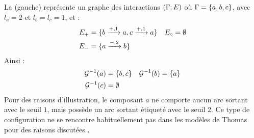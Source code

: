 \begin{example}
  La (gauche) représente un graphe des interactions $(\mathrm{\Gamma}; E)$ où
  $\mathrm{\Gamma} = \{a, b, c\}$, avec $l_a = 2$ et $l_b = l_c = 1$, et :
  \begin{align*}
    E_+ &= \{b \xrightarrow{+, 1} a, c \xrightarrow{+, 1} a\} &
    E_\circ &= \emptyset \\
    E_- &= \{a \xrightarrow{-, 2} b\}
  \end{align*}
  Ainsi :
  \begin{align*}
    \mathcal{G}^{-1}(a) &= \{ b, c \} &
    \mathcal{G}^{-1}(b) &= \{ a \} \\
    \mathcal{G}^{-1}(c) &= \emptyset
  \end{align*}
  Pour des raisons d'illustration, le composant $a$ ne comporte aucun arc sortant avec le seuil
  $1$, mais possède un arc sortant étiqueté avec le seuil $2$.
  Ce type de configuration ne se rencontre habituellement pas dans les modèles de Thomas
  pour des raisons discutées .
  
  \begin{figure}[ht]
    \begin{minipage}{0.49\textwidth}
    \centering
\end{minipage}
\end{figure}
\end{example}

